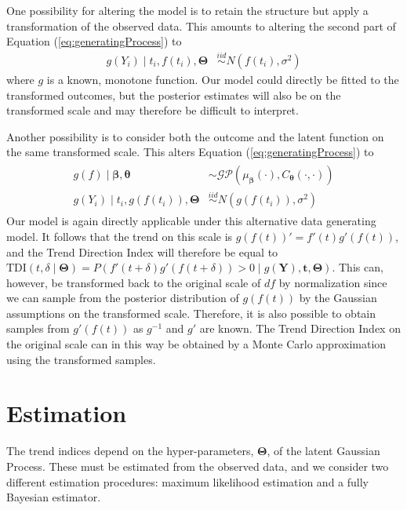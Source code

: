 \documentclass[
  11pt,
]{article}
\theoremstyle{nonumberplain}
\begin{document}
One possibility for altering the model is to retain the structure but
apply a transformation of the observed data. This amounts to altering
the second part of Equation (\ref{eq:generatingProcess}) to
\begin{align*}
  g(Y_i) \mid t_i, f(t_i), \bm{\Theta} &\overset{iid}{\sim} N(f(t_i), \sigma^2)
\end{align*} where \(g\) is a known, monotone function. Our model could
directly be fitted to the transformed outcomes, but the posterior
estimates will also be on the transformed scale and may therefore be
difficult to interpret.

Another possibility is to consider both the outcome and the latent
function on the same transformed scale. This alters Equation
(\ref{eq:generatingProcess}) to \begin{align*}
\begin{split}
  g(f) \mid \bm{\beta}, \bm{\theta} &\sim \mathcal{GP}(\mu_{\bm{\beta}}(\cdot), C_{\bm{\theta}}(\cdot,\cdot))\\
  g(Y_i) \mid t_i, g(f(t_i)), \bm{\Theta} &\overset{iid}{\sim} N(g(f(t_i)), \sigma^2)
\end{split}
\end{align*} Our model is again directly applicable under this
alternative data generating model. It follows that the trend on this
scale is \(g(f(t))' = f'(t)g'(f(t))\), and the Trend Direction Index
will therefore be equal to
\(\mathrm{TDI}(t, \delta \mid \bm{\Theta}) = P(f'(t + \delta)g'(f(t + \delta)) > 0 \mid g(\mathbf{Y}), \mathbf{t}, \bm{\Theta})\).
This can, however, be transformed back to the original scale of \(df\)
by normalization since we can sample from the posterior distribution of
\(g(f(t))\) by the Gaussian assumptions on the transformed scale.
Therefore, it is also possible to obtain samples from \(g'(f(t))\) as
\(g^{-1}\) and \(g'\) are known. The Trend Direction Index on the
original scale can in this way be obtained by a Monte Carlo
approximation using the transformed samples.

\hypertarget{sec:estimation}{%
\section{Estimation}\label{sec:estimation}}

The trend indices depend on the hyper-parameters, \(\bm{\Theta}\), of
the latent Gaussian Process. These must be estimated from the observed
data, and we consider two different estimation procedures: maximum
likelihood estimation and a fully Bayesian estimator.
\end{document}
